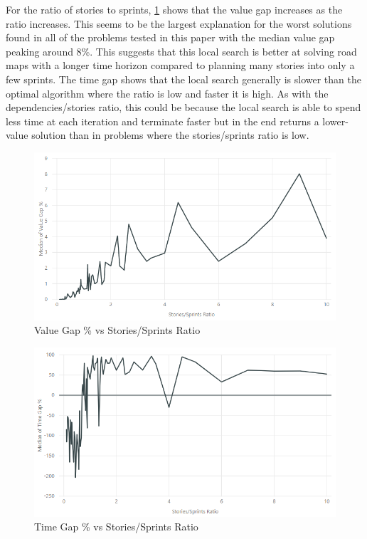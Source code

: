 For the ratio of stories to sprints, \cref{fig:value_gap_vs_stories_sprints} shows that the value gap increases as the ratio increases. This seems to be the largest explanation for the worst solutions found in all of the problems tested in this paper with the median value gap peaking around 8\%. This suggests that this local search is better at solving road maps with a longer time horizon compared to planning many stories into only a few sprints. The time gap shows that the local search generally is slower than the optimal algorithm where the ratio is low and faster it is high. As with the dependencies/stories ratio, this could be because the local search is able to spend less time at each iteration and terminate faster but in the end returns a lower-value solution than in problems where the stories/sprints ratio is low.

\begin{figure}[h!]
    \centering
    \includegraphics[width=\textwidth]{Figures/Results/annealing_value_gap_stories_sprints.png}
    \caption{Value Gap \% vs Stories/Sprints Ratio}
    \label{fig:value_gap_vs_stories_sprints}
\end{figure}

\begin{figure}[h!]
    \centering
    \includegraphics[width=\textwidth]{Figures/Results/annealing_time_gap_stories_sprints.png}
    \caption{Time Gap \% vs Stories/Sprints Ratio}
    \label{fig:time_gap_vs_stories_sprints}
\end{figure}